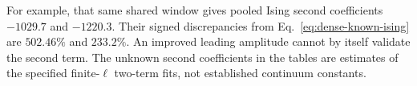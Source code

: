 For example, that same shared window gives pooled Ising second coefficients $-1029.7$ and $-1220.3$. Their signed discrepancies from Eq.~\eqref{eq:dense-known-ising} are $502.46\%$ and $233.2\%$. An improved leading amplitude cannot by itself validate the second term. The unknown second coefficients in the tables are estimates of the specified finite-$\ell$ two-term fits, not established continuum constants.
